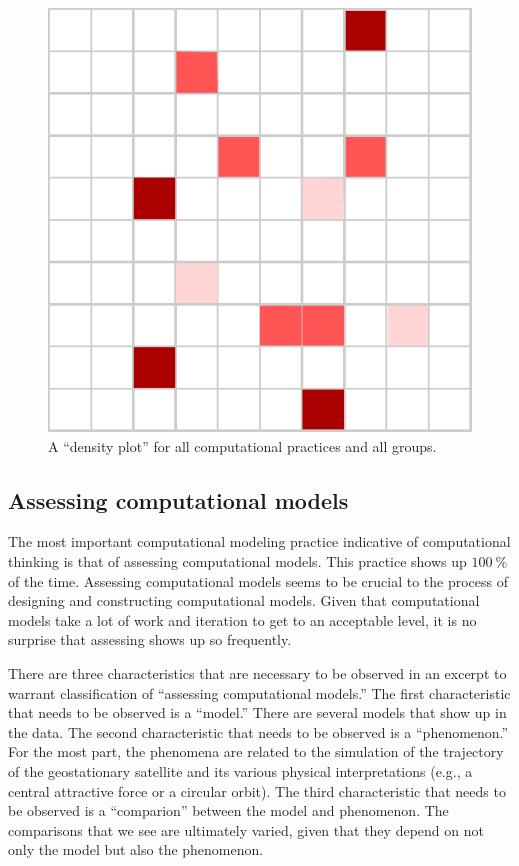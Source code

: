 \documentclass{msuphddissertation}
\begin{document}
\begin{doublespace}
\begin{figure}[ht]\centering
\includegraphics[scale=1]{./images/matrix.pdf}
\caption{A ``density plot'' for all computational practices and all groups.}\label{CH5:DensityPlot}
\end{figure}

\subsection{Assessing computational models}

The most important computational modeling practice indicative of computational thinking is that of assessing computational models.  This practice shows up $\SI{100}{\percent}$ of the time.  Assessing computational models seems to be crucial to the process of designing and constructing computational models.  Given that computational models take a lot of work and iteration to get to an acceptable level, it is no surprise that assessing shows up so frequently.

There are three characteristics that are necessary to be observed in an excerpt to warrant classification of ``assessing computational models.''  The first characteristic that needs to be observed is a ``model.''  There are several models that show up in the data.  The second characteristic that needs to be observed is a ``phenomenon.''  For the most part, the phenomena are related to the simulation of the trajectory of the geostationary satellite and its various physical interpretations (e.g., a central attractive force or a circular orbit).  The third characteristic that needs to be observed is a ``comparion'' between the model and phenomenon.  The comparisons that we see are ultimately varied, given that they depend on not only the model but also the phenomenon.


\end{doublespace}
\end{document}
